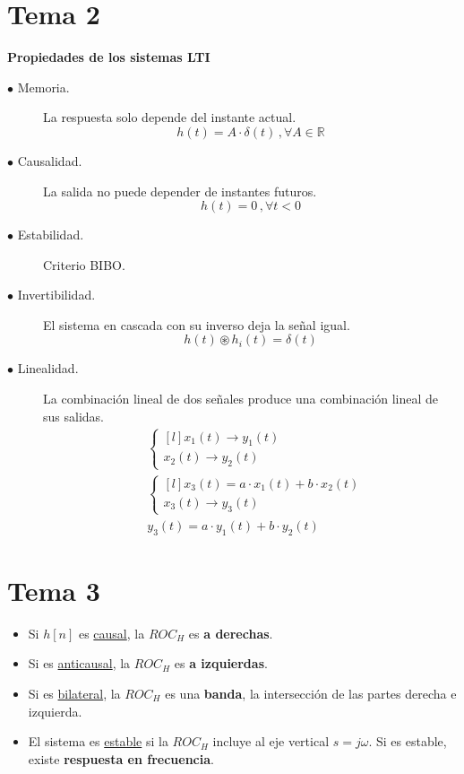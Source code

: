 \documentclass[a4paper]{book}
\begin{document}
\begin{landscape}
\begin{multicols}{4}
		\section*{Tema 2}
		\textbf{Propiedades de los sistemas LTI}
		\begin{description}
			\item[$\bullet$ Memoria.] La respuesta solo depende del instante actual. \[ h(t) = A \cdot \delta (t) \, , \forall A \in \mathbb{R} \]
			\item[$\bullet$ Causalidad.] La salida no puede depender de instantes futuros. \[ h(t) = 0 \, , \forall t<0 \]
			\item[$\bullet$ Estabilidad.] Criterio BIBO.
			\item[$\bullet$ Invertibilidad.] El sistema en cascada con su inverso deja la señal igual. \[ h(t) \circledast h_i(t) = \delta (t)\]
			\item[$\bullet$ Linealidad.] La combinación lineal de dos señales produce una combinación lineal de sus salidas.
				\begin{align*}
					 & \left\lbrace \begin{matrix*}[l]
						x_1(t) \longrightarrow y_1(t)\\
						x_2(t) \longrightarrow y_2(t)
					\end{matrix*} \right. \\[5pt]
					 & \left\lbrace \begin{matrix*}[l]
						x_3(t) = a \cdot x_1(t) + b \cdot x_2(t)\\[5pt]
						x_3(t) \longrightarrow y_3(t)
					\end{matrix*} \right. \\[5pt]
					 & y_3(t) = a \cdot y_1(t) + b \cdot y_2(t)
				\end{align*}
		\end{description}

		\columnbreak
		\section*{Tema 3}
		\begin{itemize}
			\item Si $h[n]$ es \underline{causal}, la $ROC_H$ es \textbf{a derechas}.
			\item Si es \underline{anticausal}, la $ROC_H$ es \textbf{a izquierdas}.
			\item Si es \underline{bilateral}, la $ROC_H$ es una \textbf{banda}, la intersección de las partes derecha e izquierda.
			\item El sistema es \underline{estable} si la $ROC_H$ incluye al eje vertical $s=j\omega$. Si es estable, existe \textbf{respuesta en frecuencia}.
		\end{itemize}


\end{multicols}
\end{landscape}
\end{document}
